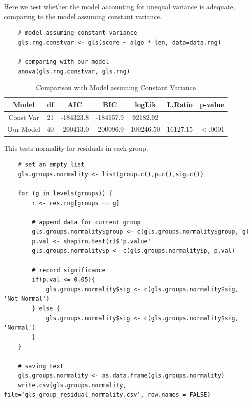 \documentclass{report}
\begin{document}
\newpage
Here we test whether the model accounting for unequal variance is adequate, comparing to the model assuming constant variance.

\begin{mdframed}
\begin{lstlisting}
    # model assuming constant variance
    gls.rng.constvar <- gls(score ~ algo * len, data=data.rng)

    # comparing with our model
    anova(gls.rng.constvar, gls.rng)
\end{lstlisting}
\end{mdframed}

\begin{table}[h]
\centering
\begin{tabular}{ccccccc}
    \hline
    Model & df & AIC & BIC & logLik & L.Ratio & p-value\\ \hline
    Const Var & 21 & -184323.8 & -184157.9 & 92182.92 & &\\ 
    Our Model & 40 & -200413.0 & -200096.9 & 100246.50 & 16127.15 & $<.0001$ \\ \hline
\end{tabular}
\caption{Comparison with Model assuming Constant Variance}
\label{tab:CompWithModelAssumingConstVar}
\end{table}

This tests normality for residuals in each group.
\begin{mdframed}
\begin{lstlisting}
    # set an empty list
    gls.groups.normality <- list(group=c(),p=c(),sig=c())

    for (g in levels(groups)) {
        r <- res.rng[groups == g]

        # append data for current group
        gls.groups.normality$group <- c(gls.groups.normality$group, g)
        p.val <- shapiro.test(r)$'p.value'
        gls.groups.normality$p <- c(gls.groups.normality$p, p.val)

        # record significance
        if(p.val <= 0.05){
            gls.groups.normality$sig <- c(gls.groups.normality$sig, 'Not Normal')
        } else {
            gls.groups.normality$sig <- c(gls.groups.normality$sig, 'Normal')
        }
    }

    # saving text
    gls.groups.normality <- as.data.frame(gls.groups.normality)
    write.csv(gls.groups.normality, file='gls_group_residual_normality.csv', row.names = FALSE)
\end{lstlisting}
\end{mdframed}
\end{document}
